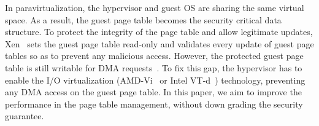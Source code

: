 


In paravirtualization, the hypervisor and guest OS are sharing the same virtual space.
As a result, the guest page table becomes the security critical data structure.
To protect the integrity of the page table and allow legitimate updates, Xen~\cite{barham2003xen} sets the guest page table read-only and validates every update of guest page tables so as to prevent any malicious access. 
However, the protected guest page table is still writable for DMA requests~\cite{disaggregation,adams2006comparison}. 
To fix this gap, the hypervisor has to enable the I/O virtualization (AMD-Vi~\cite{amdvt} or Intel VT-d~\cite{intelvt}) technology, preventing any DMA access on the guest page table.
In this paper, we aim to improve the performance in the page table management, without down grading the security guarantee.

